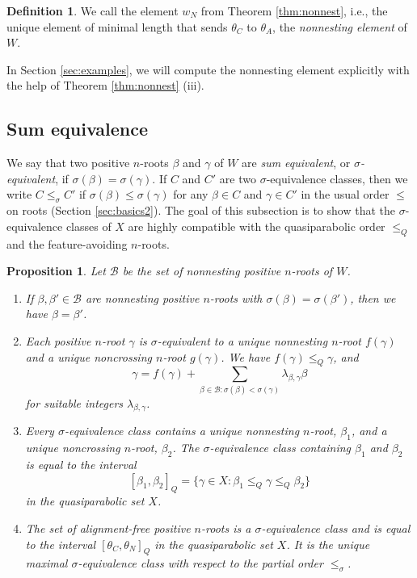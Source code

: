 \documentclass[11pt]{amsart}
\theoremstyle{plain}
\newtheorem{prop}[theorem]{Proposition}
\theoremstyle{definition}
\newtheorem{defn}[theorem]{Definition}
\theoremstyle{remark}
\numberwithin{equation}{subsection}
\newcommand{\be}{\beta}
\newcommand{\Be}{\mathcal B}
\begin{document}
\begin{defn}
    \label{def:wN}
    We call the element $w_N$ from Theorem \ref{thm:nonnest}, i.e., the unique
    element of minimal length that sends $\theta_C$ to $\theta_A$, the
    \emph{nonnesting element} of $W$.
\end{defn}

In Section \ref{sec:examples}, we will compute the nonnesting element
explicitly with the help of Theorem \ref{thm:nonnest} (iii).


\subsection{Sum equivalence}
We say that two positive $n$-roots $\beta$ and $\gamma$ of $W$  are \emph{sum
equivalent}, or {\it $\sigma$-equivalent}, if $\sigma(\beta) = \sigma(\gamma)$.
If $C$ and $C'$ are two $\sigma$-equivalence classes, then we write $C\le_\sigma
C'$ if $\sigma(\beta)\le \sigma(\gamma)$ for any $\beta\in C$ and $\gamma\in
C'$ in the usual order $\le$ on roots (Section \ref{sec:basics2}). The goal of this subsection is to show that the $\sigma$-equivalence
classes of $X$ are highly compatible with the quasiparabolic order $\le_Q$ and
the feature-avoiding $n$-roots.

\begin{prop}\label{prop:sumclass}
Let $\Be$ be the set of nonnesting positive $n$-roots of $W$.
\begin{enumerate}
    \item[{\rm (i)}]{If $\be, \be'\in \Be$ are nonnesting positive $n$-roots
             with $\sigma(\be) = \sigma(\be')$, then we have $\be = \be'$.}
         \item[{\rm (ii)}]{Each positive $n$-root $\gamma$ is
          $\sigma$-equivalent to a unique nonnesting $n$-root $f(\gamma)$ and a
          unique noncrossing $n$-root $g(\gamma)$. We have $f(\gamma)\le_Q
          \gamma$, and
          \begin{equation*} \gamma=f(\gamma)+\sum_{\beta\in \Be:
           \sigma(\beta)<\sigma(\gamma)} \lambda_{\beta,\gamma}\beta
   \end{equation*} for suitable integers $\lambda_{\be,\gamma}$.  }
  \item[{\rm (iii)}] Every $\sigma$-equivalence class contains a unique
       nonnesting $n$-root, $\be_1$, and a unique noncrossing $n$-root, $\be_2$.
       The $\sigma$-equivalence class containing $\be_1$ and $\be_2$ is equal to
       the
       interval $$ [\be_1, \be_2]_{Q} = \{ \gamma \in X : \be_1 \leq_Q \gamma \leq_Q
       \beta_2 \} $$ in the quasiparabolic set $X$.
   \item[{\rm (iv)}] The set of alignment-free positive $n$-roots is a
     $\sigma$-equivalence class and is equal to the interval
     $[\theta_C,\theta_N]_Q$ in the quasiparabolic set $X$. It is the unique
     maximal
     $\sigma$-equivalence class with respect to the partial order $\le_\sigma$.
\end{enumerate}
\end{prop}
\end{document}
